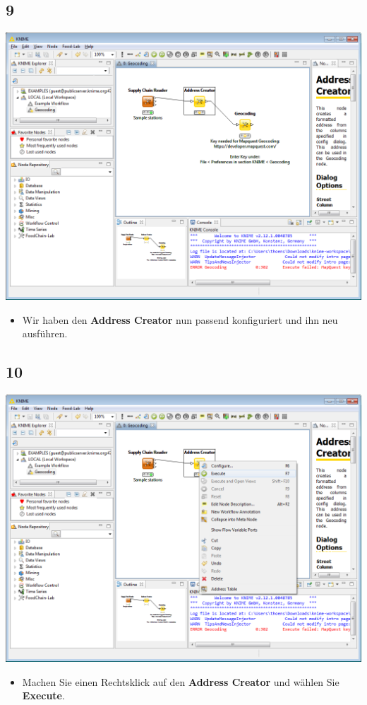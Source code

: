 \documentclass{beamer}
\begin{document}
\subsection{9}
\begin{frame}
	\begin{center}
  		\includegraphics[height=0.6\textheight]{9.png}
	\end{center}
	\begin{itemize}
		\item Wir haben den \textbf{Address Creator} nun passend konfiguriert und ihn neu ausführen.
	\end{itemize}
\end{frame}

\subsection{10}
\begin{frame}
	\begin{center}
  		\includegraphics[height=0.6\textheight]{10.png}
	\end{center}
	\begin{itemize}
		\item Machen Sie einen Rechtsklick auf den \textbf{Address Creator} und wählen Sie \textbf{Execute}.
	\end{itemize}
\end{frame}
\end{document}
